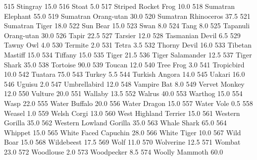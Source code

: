 \documentclass[a4paper]{article}
\begin{document}
\begin{Schunk}
\begin{Soutput}
515                       Stingray     15.0
516                          Stoat      5.0
517            Striped Rocket Frog     10.0
518              Sumatran Elephant     55.0
519            Sumatran Orang-utan     30.0
520            Sumatran Rhinoceros     37.5
521                 Sumatran Tiger     18.0
522                       Sun Bear     15.0
523                           Swan      8.0
524                           Tang      8.0
525            Tapanuli Orang-utan     30.0
526                          Tapir     22.5
527                        Tarsier     12.0
528                Tasmanian Devil      6.5
529                      Tawny Owl      4.0
530                        Termite      2.0
531                          Tetra      3.5
532                   Thorny Devil     16.0
533                Tibetan Mastiff     15.0
534                        Tiffany     15.0
535                          Tiger     21.5
536               Tiger Salamander     12.5
537                    Tiger Shark     35.0
538                       Tortoise     90.0
539                         Toucan     12.0
540                      Tree Frog      3.0
541                     Tropicbird     10.0
542                        Tuatara     75.0
543                         Turkey      5.5
544                 Turkish Angora     14.0
545                         Uakari     16.0
546                         Uguisu      2.0
547                   Umbrellabird     12.0
548                    Vampire Bat      8.0
549                  Vervet Monkey     12.0
550                        Vulture     20.0
551                        Wallaby     13.5
552                         Walrus     40.0
553                        Warthog     15.0
554                           Wasp     22.0
555                  Water Buffalo     20.0
556                   Water Dragon     15.0
557                     Water Vole      0.5
558                         Weasel      1.0
559                    Welsh Corgi     13.0
560          West Highland Terrier     15.0
561                Western Gorilla     35.0
562        Western Lowland Gorilla     35.0
563                    Whale Shark     65.0
564                        Whippet     15.0
565           White Faced Capuchin     28.0
566                    White Tiger     10.0
567                      Wild Boar     15.0
568                     Wildebeest     17.5
569                           Wolf     11.0
570                      Wolverine     12.5
571                         Wombat     23.0
572                      Woodlouse      2.0
573                     Woodpecker      8.5
574                 Woolly Mammoth     60.0

\end{Soutput}
\end{Schunk}
\end{document}
